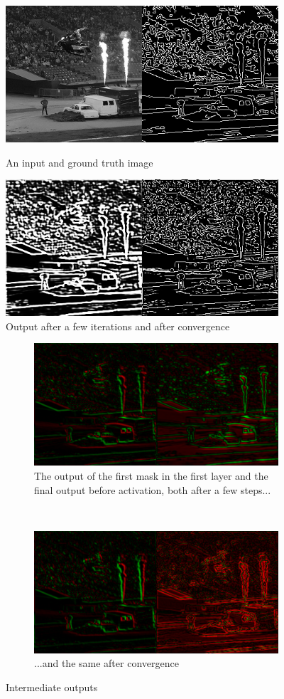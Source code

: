 \documentclass[12pt]{report}
\begin{document}
\begin{figure}
	\centering
	\includegraphics[width=0.8\linewidth]{images/out1.png}
	\caption{An input and ground truth image}
	\includegraphics[width=0.8\linewidth]{images/out2.png}
	\caption{Output after a few iterations and after convergence}
\end{figure}

\begin{figure}
	\centering
	\begin{subfigure}[b]{\linewidth}
		\centering
		\includegraphics[width=0.8\linewidth]{images/layer1.png}
		\caption{The output of the first mask in the first layer and the final output before activation, both after a few steps...}
	\end{subfigure}
	\\
	\begin{subfigure}[b]{\linewidth}
		\centering
		\includegraphics[width=0.8\linewidth]{images/layer2.png}
		\caption{...and the same after convergence}
	\end{subfigure}
	\caption{Intermediate outputs}
\end{figure}
\end{document}

